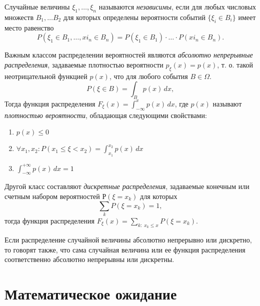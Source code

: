 \begin{defn} Случайные величины $\xi_1,\dots,\xi_n$ называются \textit{независимы}, если для любых числовых множеств $B_1,\dots B_2$ для которых определены вероятности событий $\{\xi_i\in B_i\}$ имеет место равенство
$$
P(\xi_1\in B_1,\dots, xi_n \in B_n)=P(\xi_1\in B_1)\cdot\dots\cdot P(xi_n \in B_n).
$$
\end{defn}
Важным классом распределении вероятностей являются \textit{абсолютно непрерывные распределения}, задаваемые плотностью вероятности $p_\xi(x) = p(x)$, т. о. такой неотрицательной функцией $p(x)$, что для любого события $B\in\Omega$.
$$
P(\xi \in B)=\int_B p(x)\,dx,
$$
Тогда функция распределения $F_\xi(x)=\int_{-\infty}^{x}p(x)\,dx$, где $p(x)$ называют \textit{плотностью вероятности}, обладающая следующими свойствами:
\begin{enumerate}
\item 
$p(x)\le 0$
\item 
$\forall x_1,x_2: P(x_1\le\xi<x_2)=\int_{x_1}^{x_2}p(x)\,dx$
\item
$\int_{-\infty}^{+\infty}p(x)\,dx=1$
\end{enumerate}

Другой класс составляют \textit{дискретные распределения}, задаваемые конечным или счетным набором вероятностей $Р(\xi=x_k)$ для которых
$$
\sum\limits_k P(\xi=x_k)=1,
$$
тогда функция распределения $F_\xi(x)=\sum\limits_{k:\; x_k \le x} P(\xi=x_k)$.

Если распределение случайной величины абсолютно непрерывно или дискретно, то говорят также, что сама случайная величина или ее функция распределения соответственно абсолютно непрерывны или дискретны.

\section{Математическое ожидание}

